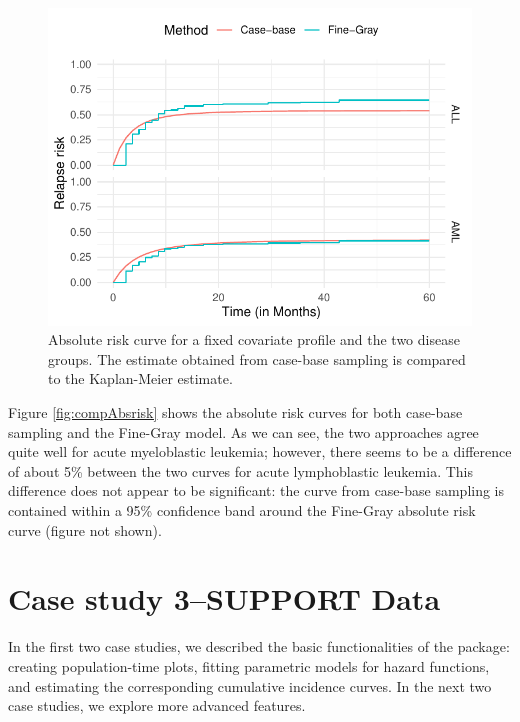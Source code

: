 \documentclass[
]{jss}
\begin{document}
\begin{CodeChunk}
\begin{figure}

{\centering \includegraphics{../figures/bmtcrr-risk-1} 

}

\caption{\label{fig:compAbsrisk} Absolute risk curve for a fixed covariate profile and the two disease groups. The estimate obtained from case-base sampling is compared to the Kaplan-Meier estimate.}\label{fig:bmtcrr-risk}
\end{figure}
\end{CodeChunk}

Figure \ref{fig:compAbsrisk} shows the absolute risk curves for both
case-base sampling and the Fine-Gray model. As we can see, the two
approaches agree quite well for acute myeloblastic leukemia; however,
there seems to be a difference of about 5\% between the two curves for
acute lymphoblastic leukemia. This difference does not appear to be
significant: the curve from case-base sampling is contained within a
95\% confidence band around the Fine-Gray absolute risk curve (figure
not shown).

\hypertarget{case-study-3support-data}{%
\section{Case study 3--SUPPORT Data}\label{case-study-3support-data}}

In the first two case studies, we described the basic functionalities of
the  package: creating population-time plots, fitting
parametric models for hazard functions, and estimating the corresponding
cumulative incidence curves. In the next two case studies, we explore
more advanced features.
\end{document}
